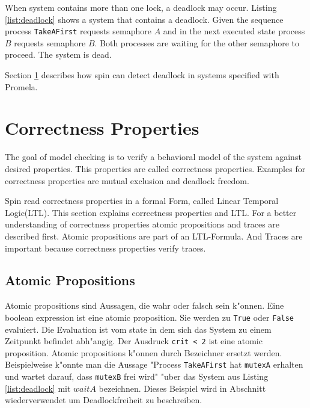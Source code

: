 \documentclass[a4paper, twoside]{article}
\begin{document}
When system contains more than one lock, a deadlock may occur. Listing \ref{list:deadlock} shows a system that contains a deadlock. Given the sequence process \verb|TakeAFirst| requests semaphore $A$ and in the next executed state process $B$ requests semaphore $B$. Both processes are waiting for the other semaphore to proceed. The system is dead.

Section \ref{sec:ltl} describes how spin can detect deadlock in systems specified with Promela.



\section{Correctness Properties}
\label{sec:ltl}

The goal of model checking is to verify a behavioral model of the system against desired properties. This properties are called correctness properties. Examples for correctness properties are mutual exclusion and deadlock freedom. 

Spin read correctness properties in a formal Form, called Linear Temporal Logic(LTL). This section explains correctness properties and LTL. For a better understanding of correctness properties atomic propositions and traces are described first. Atomic propositions are part of an LTL-Formula. And Traces are important because correctness properties verify traces.

\subsection{Atomic Propositions}
\label{sec:atomicpropositions}

Atomic propositions sind Aussagen, die wahr oder falsch sein k"onnen. Eine boolean expression ist eine atomic proposition. Sie werden zu \verb|True| oder \verb|False| evaluiert. Die Evaluation ist vom state in dem sich das System zu einem Zeitpunkt befindet abh"angig. Der Ausdruck \verb|crit < 2| ist eine atomic proposition. Atomic propositions k"onnen durch Bezeichner ersetzt werden. Beispielweise k"onnte man die Aussage "Process \verb|TakeAFirst| hat \verb|mutexA| erhalten und wartet darauf, dass \verb|mutexB| frei wird" "uber das 
System aus Listing \ref{list:deadlock} mit $waitA$ bezeichnen. Dieses Beispiel wird in Abschnitt wiederverwendet um Deadlockfreiheit zu beschreiben.
\end{document}
